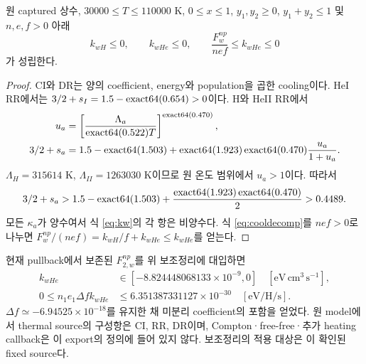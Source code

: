 \begin{lemma}\label{lem:cooling}
원 captured 상수, $30000\le T\le110000$ K, $0\le x\le1$, $y_1,y_2\ge0$, $y_1+y_2\le1$ 및 $n,e,f>0$ 아래
\begin{equation}
k_{wH}\le0,\qquad k_{wHe}\le0,
\qquad \boxed{\frac{F_w^{np}}{nef}\le k_{wHe}\le0}
\label{eq:coolcone}
\end{equation}
가 성립한다.
\end{lemma}
\begin{proof}
CI와 DR는 양의 coefficient, energy와 population을 곱한 cooling이다. HeI RR에서는 $3/2+s_I=1.5-\operatorname{exact64}(0.654)>0$이다. H와 HeII RR에서
\begin{align}
u_a&=\left[\frac{\Lambda_a}{\operatorname{exact64}(0.522)T}\right]^{\operatorname{exact64}(0.470)},\notag\\
3/2+s_a&=1.5-\operatorname{exact64}(1.503)+\operatorname{exact64}(1.923)\operatorname{exact64}(0.470)\frac{u_a}{1+u_a}.
\end{align}
$\Lambda_H=315614$ K, $\Lambda_{II}=1263030$ K이므로 원 온도 범위에서 $u_a>1$이다. 따라서
\begin{equation}
3/2+s_a>1.5-\operatorname{exact64}(1.503)
+\frac{\operatorname{exact64}(1.923)\operatorname{exact64}(0.470)}2>0.4489.
\end{equation}
모든 $\kappa_a$가 양수여서 식 \eqref{eq:kw}의 각 항은 비양수다. 식 \eqref{eq:cooldecomp}를 $nef>0$로 나누면 $F_w^{np}/(nef)=k_{wH}/f+k_{wHe}\le k_{wHe}$를 얻는다.
\end{proof}

현재 pullback에서 보존된 $F_{2,w}^{np}$를 위 보조정리에 대입하면
\begin{align}
k_{wHe}&\in[-8.824448068133\times10^{-9},0]\quad
[\mathrm{eV\,cm^3\,s^{-1}}],\\
0\le n_1e_1\Delta f k_{wHe}&\le6.351387331127\times10^{-30}\quad
[\mathrm{eV/H/s}].
\label{eq:hebound}
\end{align}
$\Delta f\simeq-6.94525\times10^{-18}$를 유지한 채 미분리 coefficient의 포함을 얻었다. 원 model에서 thermal source의 구성항은 CI, RR, DR이며, Compton·free-free·추가 heating callback은 이 export의 정의에 들어 있지 않다. 보조정리의 적용 대상은 이 확인된 fixed source다.
